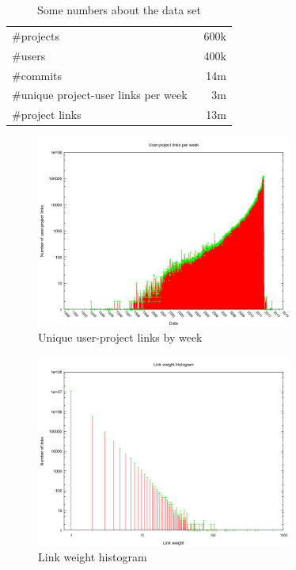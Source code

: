 \documentclass[10pt,a4paper]{article}
\begin{document}
\begin{table}
    \centering
    \begin{tabular}{l r}
        \hline
        \#projects & ~600k \\
        \#users & ~400k \\
        \#commits & ~14m \\
        \#unique project-user links per week & ~3m \\
        \#project links & 13m \\
        \hline
    \end{tabular}
    \caption{Some numbers about the data set}
    \label{tbl:dataset-numbers}
\end{table}

\begin{figure}[htb]
    \centering
    \includegraphics[width=0.75\textwidth]{user-project-links-per-week}
    \caption{Unique user-project links by week}
    \label{fig:user-project-links-per-week}
\end{figure}

\begin{figure}[htb]
    \centering
    \includegraphics[width=0.75\textwidth]{link-weight-histogram}
    \caption{Link weight histogram}
    \label{fig:link-weight-hist}
\end{figure}
\end{document}
